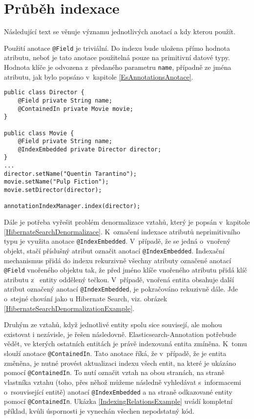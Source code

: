 \documentclass[11pt,oneside]{fithesis2}
\begin{document}
\newpage

\section{Průběh indexace}
\label{EsAnnotationsIndexacniCast}
Následující text se věnuje významu jednotlivých anotací a kdy kterou použít.

Použití anotace \texttt{@Field} je triviální. Do indexu bude uložena přímo hodnota atributu, neboť je tato anotace použitelná pouze na primitivní datové typy. Hodnota klíče je odvozena z~předaného parametru \texttt{name}, případně ze jména atributu, jak bylo popsáno v~kapitole \ref{EsAnnotationsAnotace}. 

\begin{lstlisting}[caption =  Užití anotací pro indexaci vztahů mezi entitami, label = IndexingRelationsExample]
public class Director {
	@Field private String name;
	@ContainedIn private Movie movie;
}

public class Movie {
	@Field private String name;
	@IndexEmbedded private Director director;	
}
...
director.setName("Quentin Tarantino");
movie.setName("Pulp Fiction");
movie.setDirector(director);

annotationIndexManager.index(director);
\end{lstlisting}

Dále je potřeba vyřešit problém denormalizace vztahů, který je popsán v~kapitole \ref{HibernateSearchDenormalizace}. K~označení indexace atributů neprimitivního typu je využita anotace \texttt{@IndexEmbedded}. V~případě, že se jedná o~vnořený objekt, stačí příslušný atribut označit anotací \texttt{@IndexEmbedded}. Indexační mechanismus přidá do indexu rekurzivně všechny atributy označené anotací \texttt{@Field} vnořeného objektu tak, že před jméno klíče vnořeného atributu přidá klíč atributu z~ entity oddělený tečkou. V~případě, vnořená entita obsahuje další atribut označený anotací \texttt{@IndexEmbedded}, je pokračováno rekuzivně dále. Jde o~stejné chování jako u Hibernate Search, viz. obrázek \ref{HibernateSearchDenormalizationExample}.

Druhým ze vztahů, když jednotlivé entity spolu sice souvisejí, ale mohou existovat i nezávisle, je řešen následovně. Elasticsearch-Annotation potřebude vědět, ve kterých ostatních entitách je právě indexovaná entita zmíněna. K~tomu slouží anotace \texttt{@ContainedIn}. Tato anotace říká, že v~případě, že je entita změněna, je nutné provést aktualizaci indexu všech entit, na které je ukázáno pomocí \texttt{@ContainedIn}. To nutí označit vztah na obou stranách, na straně vlastníka vztahu (toho, přes něhož můžeme následně vyhledávat s~informacemi o~rsouvisející entitě) anotací \texttt{@IndexEmbedded} a na straně odkazované entity pomocí \texttt{@ContainedIn}. Ukázka \ref{IndexingRelationsExample} uvádí kompletní příklad, kvůli úspornosti je vynechán všechen nepodstatný kód.
\end{document}
